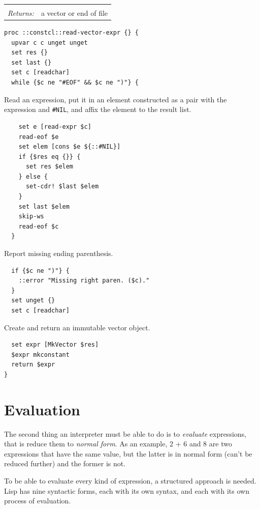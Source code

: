 \documentclass[a5paper,draft]{memoir}
\begin{document}
\noindent\begin{tabular}{ |p{1.9cm} p{6.5cm}| }
\hline
\rowcolor[HTML]{CCCCCC} \multicolumn{2}{|l|}{\textbf{read-vector-expr (internal)}} \\
\textit{Returns:} & a vector or end of file \\
\hline
\end{tabular}

\begin{lstlisting}
proc ::constcl::read-vector-expr {} {
  upvar c c unget unget
  set res {}
  set last {}
  set c [readchar]
  while {$c ne "#EOF" && $c ne ")"} {
\end{lstlisting}

Read an expression, put it in an element constructed as a pair with the expression and \texttt{\#NIL}, and affix the element to the result list.

\begin{lstlisting}
    set e [read-expr $c]
    read-eof $e
    set elem [cons $e ${::#NIL}]
    if {$res eq {}} {
      set res $elem
    } else {
      set-cdr! $last $elem
    }
    set last $elem
    skip-ws
    read-eof $c
  }
\end{lstlisting}

Report missing ending parenthesis.

\begin{lstlisting}
  if {$c ne ")"} {
    ::error "Missing right paren. ($c)."
  }
  set unget {}
  set c [readchar]
\end{lstlisting}

Create and return an immutable vector object.

\begin{lstlisting}
  set expr [MkVector $res]
  $expr mkconstant
  return $expr
}
\end{lstlisting}

\chapter{Evaluation}
\label{evaluation}

The second thing an interpreter must be able to do is to \emph{evaluate} expressions, that is reduce them to \emph{normal form}. As an example, 2 + 6 and 8 are two expressions that have the same value, but the latter is in normal form (can't be reduced further) and the former is not.

To be able to evaluate every kind of expression, a structured approach is needed. Lisp has nine syntactic forms, each with its own syntax, and each with its own process of evaluation.
\end{document}
